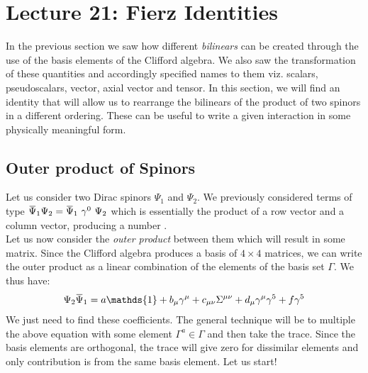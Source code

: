 \section*{Lecture 21: Fierz Identities}
In the previous section we saw how different \textit{bilinears} can be created through the use of the basis elements of the Clifford algebra. We also saw the transformation of these quantities and accordingly specified names to them viz. scalars, pseudoscalars, vector, axial vector and tensor. In this section, we will find an identity that will allow us to rearrange the bilinears of the product of two spinors in a different ordering. These can be useful to write a given interaction in some physically meaningful form.
\subsection{Outer product of Spinors}
Let us consider two Dirac spinors $\Psi_1$ and $\Psi_2$. We previously considered terms of type $\dadj{\Psi}_1\Psi_2 = \bilin{1}{2}{\gamma^0}$ which is essentially the product of a row vector and a column vector, producing a number .\\[0.2cm] Let us now consider the \textit{outer product} between them which will result in some matrix. Since the Clifford algebra produces a basis of $4\times 4$ matrices, we can write the outer product as a linear combination of the elements of the basis set $\Gamma$. We thus have:
\begin{align*}
    \Psi_2 \dadj{\Psi}_1 = a \mathds{1} + b_\mu \gamma^\mu + c_{\mu\nu} \Sigma^{\mu\nu} + d_{\mu}\gamma^\mu\gamma^5 + f\gamma^5
\end{align*}
We just need to find these coefficients. The general technique will be to multiple the above equation with some element $\Gamma^a\in \Gamma$ and then take the trace. Since the basis elements are orthogonal, the trace will give zero for dissimilar elements and only contribution is from the same basis element. Let us start!
